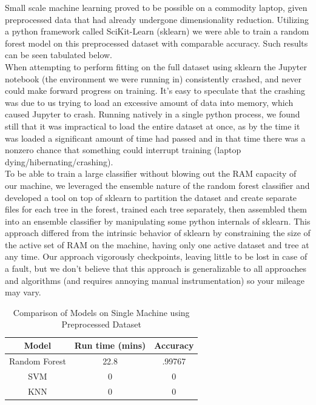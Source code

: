 \documentclass{neu_handout}
\begin{document}
Small scale machine learning proved to be possible on a commodity laptop, given preprocessed data that had already undergone dimensionality reduction. Utilizing a python framework called SciKit-Learn (sklearn) we were able to train a random forest model on this preprocessed dataset with comparable accuracy. Such results can be seen tabulated below.\\

When attempting to perform fitting on the full dataset using sklearn the Jupyter notebook (the environment we were running in) consistently crashed, and never could make forward progress on training. It's easy to speculate that the crashing was due to us trying to load an excessive amount of data into memory, which caused Jupyter to crash. Running natively in a single python process, we found still that it was impractical to load the entire dataset at once, as by the time it was loaded a significant amount of time had passed and in that time there was a nonzero chance that something could interrupt training (laptop dying/hibernating/crashing).\\

To be able to train a large classifier without blowing out the RAM capacity of our machine, we leveraged the ensemble nature of the random forest classifier and developed a tool on top of sklearn to partition the dataset and create separate files for each tree in the forest, trained each tree separately, then assembled them into an ensemble classifier by manipulating some python internals of sklearn. This approach differed from the intrinsic behavior of sklearn by constraining the size of the active set of RAM on the machine, having only one active dataset and tree at any time. Our approach vigorously checkpoints, leaving little to be lost in case of a fault, but we don't believe that this approach is generalizable to all approaches and algorithms (and requires annoying manual instrumentation) so your mileage may vary.

\begin{table}[h!]
\centering
 \begin{tabular}{||c c c||} 
 \hline
Model & Run time (mins) & Accuracy \\ [0.5ex] 
 \hline\hline
Random Forest & 22.8  & .99767   \\[1ex] 
 \hline
 SVM & 0  & 0 \\
\hline
KNN & 0  & 0 \\
\hline
 \end{tabular}
 \caption{Comparison of Models on Single Machine using Preprocessed Dataset}
 \label{tab:accuracy-comparison}
\end{table}
\end{document}

